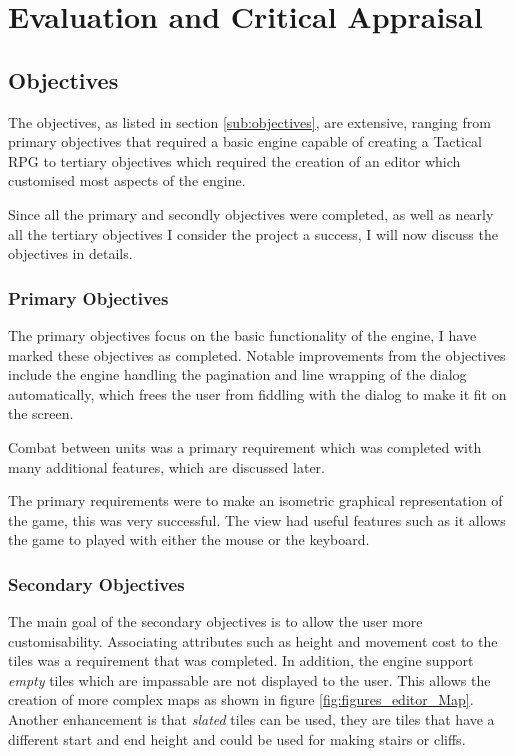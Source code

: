 \section{Evaluation and Critical Appraisal}

\subsection{Objectives}
\label{sub:eobjectives}
The objectives, as listed in section \ref{sub:objectives},  are extensive, ranging from primary objectives that required a basic engine capable of creating a Tactical RPG to tertiary objectives which required the creation of an editor which customised most aspects of the  engine. 

Since all the primary and secondly objectives were completed, as well as nearly all the tertiary objectives I consider  the project a success, I will now discuss the objectives in details.

\subsubsection{Primary Objectives}

The primary objectives focus on the basic functionality of the engine, I have marked these objectives as completed. Notable improvements from the objectives include the engine handling the pagination and line wrapping of the dialog automatically, which frees the user from fiddling with the dialog to make it fit on the screen. 

Combat between units was a primary requirement which was completed with many additional features, which are discussed later.

The primary requirements were to make an isometric graphical representation of the game, this was very successful. The view had useful features such as it allows the game to played with either the mouse or the keyboard.

\subsubsection{Secondary Objectives}
The main goal of the secondary objectives is to allow the user more customisability.  Associating attributes such as height and movement cost to the tiles was a requirement that was completed. In addition, the engine support \emph{empty} tiles which are impassable are not displayed to the user. This allows the creation of more complex maps as shown in figure \ref{fig:figures_editor_Map}. Another enhancement is that \emph{slated} tiles can be used, they are tiles that have a different start and end height and could be used for making stairs or cliffs. 


